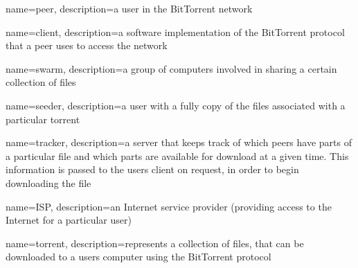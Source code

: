 {
  name=peer,
  description={a user in the BitTorrent network \citep{britannica} }
}

{
  name=client,
  description={a software implementation of the BitTorrent protocol that a peer uses to access the network \citep{britannica} }
}

{
  name=swarm,
  description={a group of computers involved in sharing a certain collection of files \citep{swarm} }
}

{
  name=seeder,
  description={a user with a fully copy of the files associated with a particular torrent }
}

{
  name=tracker,
  description={a server that keeps track of which peers have parts of a particular file and which parts are available for download at a given time. This information is passed to the users client on request, in order to begin downloading the file}
}

{
  name=ISP,
  description={an Internet service provider (providing access to the Internet for a particular user)  }
}

{
  name=torrent,
  description={represents a collection of files, that can be downloaded to a users computer using the BitTorrent protocol \citep{britannica}}
}
